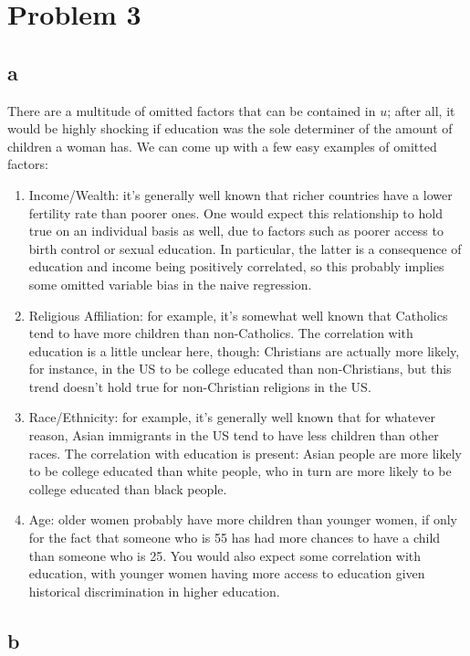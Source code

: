 \documentclass[12pt,letterpaper]{article}
\theoremstyle{definition}
\begin{document}
\section*{Problem 3}
\subsection*{a}

There are a multitude of omitted factors that can be contained in $u$; after all, it would be highly shocking if education was the sole determiner of the amount of children a woman has. We can come up with a few easy examples of omitted factors:
\begin{enumerate}
  \item Income/Wealth: it's generally well known that richer countries have a lower fertility rate than poorer ones. One would expect this relationship to hold true on an individual basis as well, due to factors such as poorer access to birth control or sexual education. In particular, the latter is a consequence of education and income being positively correlated, so this probably implies some omitted variable bias in the naive regression.
  \item Religious Affiliation: for example, it's somewhat well known that Catholics tend to have more children than non-Catholics. The correlation with education is a little unclear here, though: Christians are actually more likely, for instance, in the US to be college educated than non-Christians, but this trend doesn't hold true for non-Christian religions in the US.
  \item Race/Ethnicity: for example, it's generally well known that for whatever reason, Asian immigrants in the US tend to have less children than other races. The correlation with education is present: Asian people are more likely to be college educated than white people, who in turn are more likely to be college educated than black people.
  \item Age: older women probably have more children than younger women, if only for the fact that someone who is 55 has had more chances to have a child than someone who is 25. You would also expect some correlation with education, with younger women having more access to education given historical discrimination in higher education.
\end{enumerate}

\subsection*{b}
\end{document}
